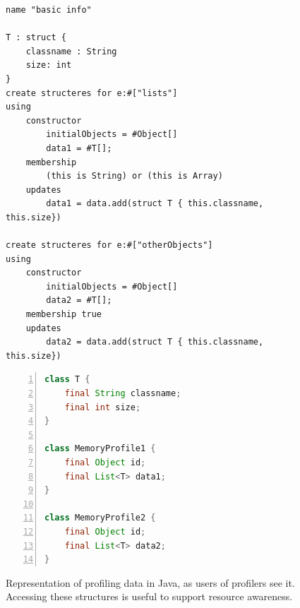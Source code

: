 \begin{figure}
\centering
\begin{minipage}[t]{0.60\linewidth}
\begin{lstlisting}[language=DSL2]
name "basic info" 

T : struct {
	classname : String
	size: int
}
create structeres for e:#["lists"]
using
	constructor
		initialObjects = #Object[]
		data1 = #T[];
	membership
		(this is String) or (this is Array)
	updates
		data1 = data.add(struct T { this.classname, this.size})
		
create structeres for e:#["otherObjects"]
using
	constructor
		initialObjects = #Object[]
		data2 = #T[];
	membership true
	updates
		data2 = data.add(struct T { this.classname, this.size})
\end{lstlisting}
\end{minipage}
\hspace{0.07\linewidth}
\begin{minipage}[t]{0.30\linewidth}
\begin{lstlisting}[language=java, frame=L, numbers=left,numberstyle=\color{black}\scriptsize]
class T {
	final String classname;
	final int size;
}

class MemoryProfile1 {
	final Object id;
	final List<T> data1;
}

class MemoryProfile2 {
	final Object id;
	final List<T> data2;
}
\end{lstlisting}
\end{minipage}
\caption{Representation of profiling data in Java, as users of profilers see it. Accessing these structures is useful to support resource awareness.} \label{fig:dsl-generated-java}
\end{figure}




